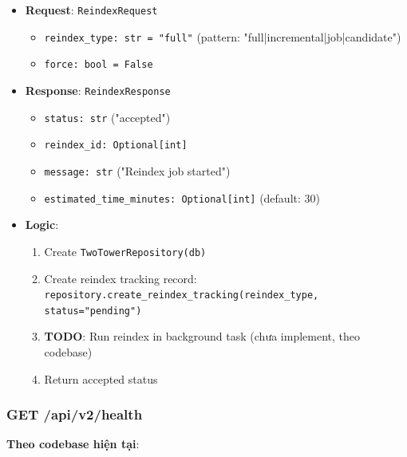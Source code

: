 \begin{itemize}
    \item \textbf{Request}: \texttt{ReindexRequest}
    \begin{itemize}
        \item \texttt{reindex\_type: str = "full"} (pattern: "full|incremental|job|candidate")
        \item \texttt{force: bool = False}
    \end{itemize}
    
    \item \textbf{Response}: \texttt{ReindexResponse}
    \begin{itemize}
        \item \texttt{status: str} ("accepted")
        \item \texttt{reindex\_id: Optional[int]}
        \item \texttt{message: str} ("Reindex job started")
        \item \texttt{estimated\_time\_minutes: Optional[int]} (default: 30)
    \end{itemize}
    
    \item \textbf{Logic}:
    \begin{enumerate}
        \item Create \texttt{TwoTowerRepository(db)}
        \item Create reindex tracking record: \texttt{repository.create\_reindex\_tracking(reindex\_type, status="pending")}
        \item \textbf{TODO}: Run reindex in background task (chưa implement, theo codebase)
        \item Return accepted status
    \end{enumerate}
\end{itemize}

\subsubsection{GET /api/v2/health}

\textbf{Theo codebase hiện tại}:

